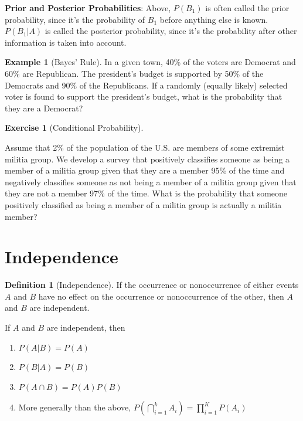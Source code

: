 \documentclass[
]{book}
\providecommand{\tightlist}{%
  \setlength{\itemsep}{0pt}\setlength{\parskip}{0pt}}
\theoremstyle{definition}
\newtheorem{definition}{Definition}[chapter]
\theoremstyle{definition}
\newtheorem{example}{Example}[chapter]
\theoremstyle{definition}
\newtheorem{exercise}{Exercise}[chapter]
\theoremstyle{definition}
\theoremstyle{remark}
\begin{document}
\textbf{Prior and Posterior Probabilities}: Above, \(P(B_1)\) is often called the prior probability, since it's the probability of \(B_1\) before anything else is known. \(P(B_1|A)\) is called the posterior probability, since it's the probability after other information is taken into account.

\begin{example}[Bayes' Rule]
\protect\hypertarget{exm:bayesrule}{}{\label{exm:bayesrule} {} }
In a given town, 40\% of the voters are Democrat and 60\% are Republican. The president's budget is supported by 50\% of the Democrats and 90\% of the Republicans. If a randomly (equally likely) selected voter is found to support the president's budget, what is the probability that they are a Democrat?
\end{example}

\begin{exercise}[Conditional Probability]
\protect\hypertarget{exr:condprobexr}{}{\label{exr:condprobexr} {} }

Assume that 2\% of the population of the U.S. are members of some extremist militia group. We develop a survey that positively classifies someone as being a member of a militia group given that they are a member 95\% of the time and negatively classifies someone as not being a member of a militia group given that they are not a member 97\% of the time. What is the probability that someone positively classified as being a member of a militia group is actually a militia member?
\end{exercise}

\hypertarget{independence}{%
\section{Independence}\label{independence}}

\begin{definition}[Independence]
\protect\hypertarget{def:unnamed-chunk-257}{}{\label{def:unnamed-chunk-257} {} } If the occurrence or nonoccurrence of either events \(A\) and \(B\) have no effect on the occurrence or nonoccurrence of the other, then \(A\) and \(B\) are independent.
\end{definition}

If \(A\) and \(B\) are independent, then

\begin{enumerate}
\def\labelenumi{\arabic{enumi}.}
\tightlist
\item
  \(P(A|B)=P(A)\)
\item
  \(P(B|A)=P(B)\)
\item
  \(P(A\cap B)=P(A)P(B)\)
\item
  More generally than the above, \(P(\bigcap_{i=1}^k A_i) = \prod_{i = 1}^K P(A_i)\)
\end{enumerate}
\end{document}
